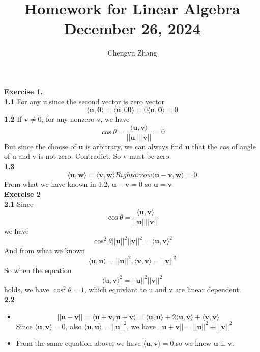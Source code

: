 \documentclass{article}
\title{\vspace*{-3.5cm}Homework for Linear Algebra \\December 26, 2024}
\author{Chengyu Zhang}
\date{}
\begin{document}
\maketitle
\textbf{Exercise 1.}\\
  \textbf{1.1} For any u,since the second vector is zero vector\[
  \langle\mathbf{u},\mathbf{0}\rangle=\langle\mathbf{u},0\mathbf{0}\rangle=0\langle\mathbf{u},\mathbf{0}\rangle=0
  \]
  \textbf{1.2} If $\mathbf{v}\neq 0$, for any nonzero v, we have 
  \[
  \cos \theta = \frac{\langle\mathbf{u},\mathbf{v}\rangle}{||\mathbf{u}||||\mathbf{v}||} = 0
  \]
  But since the choose of $\mathbf{u}$ is arbitrary, we can always find $\mathbf{u}$ that the cos of angle of u and v is not zero. Contradict. So v must be zero. \\
  \textbf{1.3} \[
    \langle\mathbf{u},\mathbf{w}\rangle=\langle\mathbf{v},\mathbf{w}\rangle Rightarrow \langle\mathbf{u}-\mathbf{v},\mathbf{w}\rangle=0
  \]
  From what we have known in 1.2, $\mathbf{u}-\mathbf{v}=0$ so $\mathbf{u}=\mathbf{v}$\\

\textbf{Exercise 2}\\

  \textbf{2.1} Since\[
    \cos \theta = \frac{\langle\mathbf{u},\mathbf{v}\rangle}{||\mathbf{u}||||\mathbf{v}||} 
  \]
  we have
  \[
    \cos^2 \theta ||\mathbf{u}|| ^2||\mathbf{v}|| ^2= \langle\mathbf{u},\mathbf{v}\rangle^2
  \]
  And from what we known\[
    \langle\mathbf{u},\mathbf{u}\rangle=||\mathbf{u}|| ^2 ,  \langle\mathbf{v},\mathbf{v}\rangle=||\mathbf{v}|| ^2
  \]
  So when the equation \[
    \langle\mathbf{u},\mathbf{v}\rangle^2=||\mathbf{u}|| ^2||\mathbf{v}|| ^2
  \]
  holds, we have $\cos^2 \theta =1$, which equivlant to u and v are linear dependent.\\

  \textbf{2.2} 
  \begin{itemize}
    \item \[
        ||\mathbf{u}+\mathbf{v}||=\langle\mathbf{u}+\mathbf{v},\mathbf{u}+\mathbf{v}\rangle=\langle\mathbf{u},\mathbf{u}\rangle+2\langle\mathbf{u},\mathbf{v}\rangle+\langle\mathbf{v},\mathbf{v}\rangle
    \]
    Since $\langle\mathbf{u},\mathbf{v}\rangle=0$, also $\langle\mathbf{u},\mathbf{u}\rangle=||\mathbf{u}||^2$, we have $||\mathbf{u}+\mathbf{v}||=||\mathbf{u}||^2+||\mathbf{v}||^2$
    \item From the same equation above, we have $\langle\mathbf{u},\mathbf{v}\rangle=0$,so we know $\mathbf{u}\perp\mathbf{v}$.
  \end{itemize}
\end{document}
